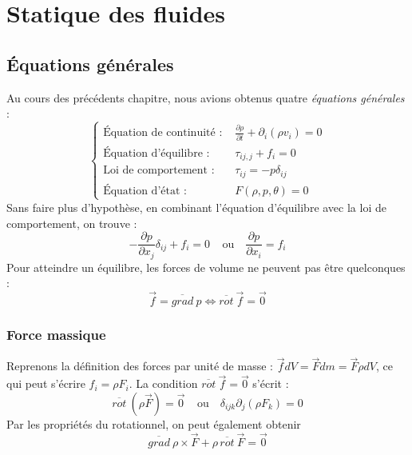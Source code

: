 \chapter{Statique des fluides}
\section{Équations générales}
Au cours des précédents chapitre, nous avions obtenus quatre \textit{équations générales} :
\begin{equation}
\left\{\begin{array}{ll}
\text{Équation de continuité : } & \frac{\partial \rho}{\partial t} + \partial_i(\rho v_i)
=0\\
\text{Équation d'équilibre : } & \tau_{ij,j} + f_i = 0\\
\text{Loi de comportement : } & \tau_{ij} = -p\delta_{ij}\\
\text{Équation d'état : } & F(\rho,p, \theta) = 0
\end{array}\right.
\end{equation}
Sans faire plus d'hypothèse, en combinant l'équation d'équilibre avec la loi de comportement,
on trouve :
\begin{equation}
-\frac{\partial p}{\partial x_j}\delta_{ij} + f_i = 0\ \ \ \ \ \text{ou }\ \ \ 
\frac{\partial p}{\partial x_i} = f_i
\end{equation}
Pour atteindre un équilibre, les forces de volume ne peuvent pas être quelconques :
\begin{equation}
\vec{f} = \overline{grad}\ p \Leftrightarrow \overline{rot}\ \vec{f} = \vec{0}
\end{equation}

	\subsection{Force massique}
	Reprenons la définition des forces par unité de masse : $\vec{f}dV = \vec{F}dm = \vec{F}
	\rho dV$, ce qui peut s'écrire $f_i = \rho F_i$. La condition $\overline{rot}\ \vec{f} =
	\vec{0}$ s'écrit :
	\begin{equation}
	\overline{rot}\ (\rho\vec{F}) = \vec{0}\ \ \ \ \ \text{ou }\ \ \ \delta_{ijk}\partial_j
	(\rho F_k) = 0
	\end{equation}
	Par les propriétés du rotationnel, on peut également obtenir
	\begin{equation}
	\overline{grad}\ \rho \times \vec{F} + \rho\,\overline{rot}\ \vec{F} = \vec{0}
	\end{equation}		
	
